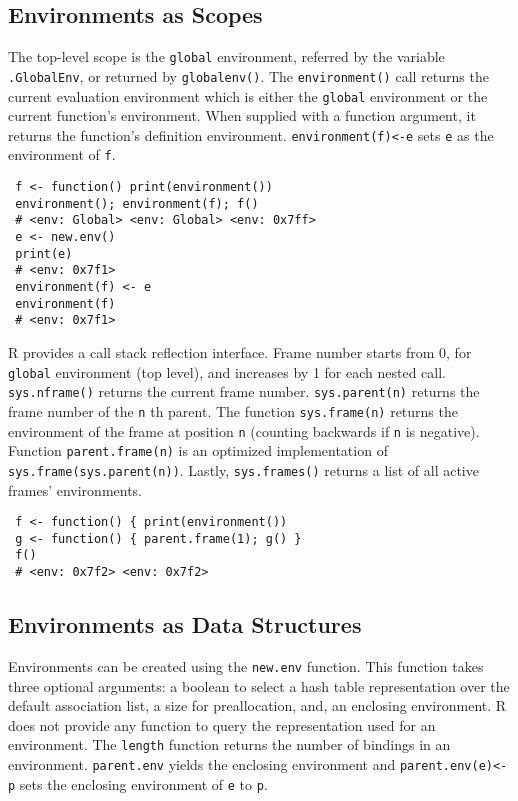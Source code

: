 \documentclass[10pt,review,sigplan,authorversion=true]{acmart}
\newcommand{\code}[1]{\lstinline |#1|\xspace}
\newcommand{\newEnv}{\code{new.env}}
\newcommand{\parentEnv}{\code{parent.env}}
\begin{document}
\subsection{Environments as Scopes}
The top-level scope is the \code{global} environment, referred by the variable
\code{.GlobalEnv}, or returned by \code{globalenv()}. The \code{environment()}
call returns the current evaluation environment which is either the
\code{global} environment or the current function's environment. When supplied
with a function argument, it returns the function's definition environment.
\code{environment(f)<-e} sets \code{e} as the environment of \code{f}.

\begin{lstlisting}
 f <- function() print(environment())
 environment(); environment(f); f()
 # <env: Global> <env: Global> <env: 0x7ff>
 e <- new.env()
 print(e)
 # <env: 0x7f1>
 environment(f) <- e
 environment(f)
 # <env: 0x7f1>
\end{lstlisting}

\noindent
R provides a call stack reflection interface. Frame number starts from 0, for
\code{global} environment (top level), and increases by 1 for each nested call.
\code{sys.nframe()} returns the current frame number. \code{sys.parent(n)}
returns the frame number of the \code{n}th parent. The function
\code{sys.frame(n)} returns the environment of the frame at position \code{n}
(counting backwards if \code{n} is negative). Function \code{parent.frame(n)} is
an optimized implementation of \code{sys.frame(sys.parent(n))}. Lastly,
\code{sys.frames()} returns a list of all active frames' environments.

\begin{lstlisting}
 f <- function() { print(environment())
 g <- function() { parent.frame(1); g() }
 f()
 # <env: 0x7f2> <env: 0x7f2>
\end{lstlisting}

\subsection{Environments as Data Structures}

Environments can be created using the \newEnv function. This function takes
three optional arguments: a boolean to select a hash table representation over
the default association list, a size for preallocation, and, an enclosing
environment. R does not provide any function to query the representation used
for an environment. The \code{length} function returns the number of bindings in
an environment. \parentEnv yields the enclosing environment and
\code{parent.env(e)<-p} sets the enclosing environment of \code{e} to \code{p}.
\end{document}
